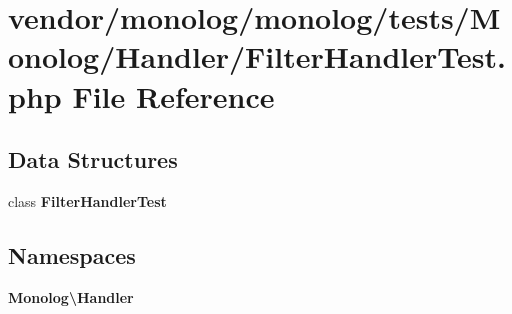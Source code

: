 \section{vendor/monolog/monolog/tests/\+Monolog/\+Handler/\+Filter\+Handler\+Test.php File Reference}
\label{_filter_handler_test_8php}
\subsection*{Data Structures}
\begin{DoxyCompactItemize}
\item 
class {\bf Filter\+Handler\+Test}
\end{DoxyCompactItemize}
\subsection*{Namespaces}
\begin{DoxyCompactItemize}
\item 
 {\bf Monolog\textbackslash{}\+Handler}
\end{DoxyCompactItemize}

